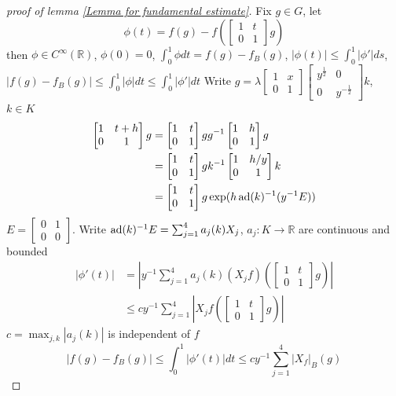 \documentclass[../main.tex]{subfiles}
\begin{document}
\begin{proof}[proof of lemma \ref{Lemma for fundamental estimate}]
Fix $g\in G$, let 
\[\phi(t)=f(g)-f\left(\begin{bmatrix}1&t\\0&1\end{bmatrix} g\right)\]
then $\phi\in C^\infty(\mathbb R)$, $\phi(0)=0$, $\displaystyle\int_0^1\phi dt=f(g)-f_B(g)$, $\displaystyle|\phi(t)|\leq\int_0^1|\phi'|ds$, $|f(g)-f_B(g)|\leq\displaystyle\int_0^1|\phi|dt\leq\int_0^1|\phi'|dt$
Write $g=\lambda\begin{bmatrix}
1&x\\
0&1
\end{bmatrix}\begin{bmatrix}
y^{\frac{1}{2}}&0\\
0&y^{-\frac{1}{2}}
\end{bmatrix}k$, $k\in K$
\begin{align*}
\begin{bmatrix}
1&t+h \\
0&1
\end{bmatrix}g&=\begin{bmatrix}
1&t \\
0&1
\end{bmatrix}gg^{-1}\begin{bmatrix}
1&h \\
0&1
\end{bmatrix}g \\
&=\begin{bmatrix}
1&t \\
0&1
\end{bmatrix}gk^{-1}\begin{bmatrix}
1&h/y \\
0&1
\end{bmatrix}k \\
&=\begin{bmatrix}
1&t \\
0&1
\end{bmatrix}g\exp(h\operatorname{ad}(k)^{-1}(y^{-1}E))
\end{align*}
$E=\begin{bmatrix}
0&1\\
0&0
\end{bmatrix}$. Write $\operatorname{ad}(k)^{-1}E=\sum_{j=1}^4a_j(k)X_j$, $a_j:K\to\mathbb R$ are continuous and bounded
\begin{align*}
|\phi'(t)|&=\left|y^{-1}\sum_{j=1}^4a_j(k)(X_jf)\left(\begin{bmatrix}
1&t\\
0&1
\end{bmatrix}g\right)\right| \\
&\leq cy^{-1}\sum_{j=1}^4\left|X_jf\left(\begin{bmatrix}
1&t\\
0&1
\end{bmatrix}g\right)\right|
\end{align*}
$c=\max_{j,k}|a_j(k)|$ is independent of $f$
\[|f(g)-f_B(g)|\leq\int_0^1|\phi'(t)|dt\leq cy^{-1}\sum_{j=1}^4|X_f|_B(g)\]
\end{proof}
\end{document}
